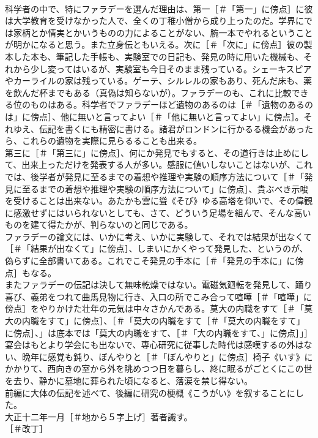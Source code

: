 \documentclass[8pt]{extreport}
\begin{document}
\begin{CJK}{UTF8}{min}
\\	科学者の中で、特にファラデーを選んだ理由は、第一［＃「第一」に傍点］に彼は大学教育を受けなかった人で、全くの丁稚小僧から成り上ったのだ。学界にでは家柄とか情実とかいうものの力によることがない、腕一本でやれるということが明かになると思う。また立身伝ともいえる。次に［＃「次に」に傍点］彼の製本した本も、筆記した手帳も、実験室での日記も、発見の時に用いた機械も、それから少し変ってはいるが、実験室も今日そのまま残っている。シェーキスピアやカーライルの家は残っている。ゲーテ、シルレルの家もあり、死んだ床も、薬を飲んだ杯までもある（真偽は知らないが）。ファラデーのも、これに比較できる位のものはある。科学者でファラデーほど遺物のあるのは［＃「遺物のあるのは」に傍点］、他に無いと言ってよい［＃「他に無いと言ってよい」に傍点］。それゆえ、伝記を書くにも精密に書ける。諸君がロンドンに行かるる機会があったら、これらの遺物を実際に見らるることも出来る。
\\	第三に［＃「第三に」に傍点］、何にか発見でもすると、その道行きは止めにして、出来上っただけを発表する人が多い。感服に値いしないことはないが、これでは、後学者が発見に至るまでの着想や推理や実験の順序方法について［＃「発見に至るまでの着想や推理や実験の順序方法について」に傍点］、貴ぶべき示唆を受けることは出来ない。あたかも雲に聳《そび》ゆる高塔を仰いで、その偉観に感激せずにはいられないとしても、さて、どういう足場を組んで、そんな高いものを建て得たかが、判らないのと同じである。
\\	ファラデーの論文には、いかに考え、いかに実験して、それでは結果が出なくて［＃「結果が出なくて」に傍点］、しまいにかくやって発見した、というのが、偽らずに全部書いてある。これでこそ発見の手本に［＃「発見の手本に」に傍点］もなる。
\\	またファラデーの伝記は決して無味乾燥ではない。電磁気廻転を発見して、踊り喜び、義弟をつれて曲馬見物に行き、入口の所でこみ合って喧嘩［＃「喧嘩」に傍点］をやりかけた壮年の元気は中々さかんである。莫大の内職をすて［＃「莫大の内職をすて」に傍点］、［＃「莫大の内職をすて［＃「莫大の内職をすて」に傍点］、」は底本では「莫大の内職をすて、［＃「大の内職をすて、」に傍点］」］宴会はもとより学会にも出ないで、専心研究に従事した時代は感嘆するの外はない、晩年に感覚も鈍り、ぼんやりと［＃「ぼんやりと」に傍点］椅子《いす》にかかりて、西向きの室から外を眺めつつ日を暮らし、終に眠るがごとくにこの世を去り、静かに墓地に葬られた頃になると、落涙を禁じ得ない。
\\	前編に大体の伝記を述べて、後編に研究の梗概《こうがい》を叙することにした。
\\	大正十二年一月［＃地から５字上げ］著者識す。
\\	［＃改丁］

\end{CJK}
\end{document}
